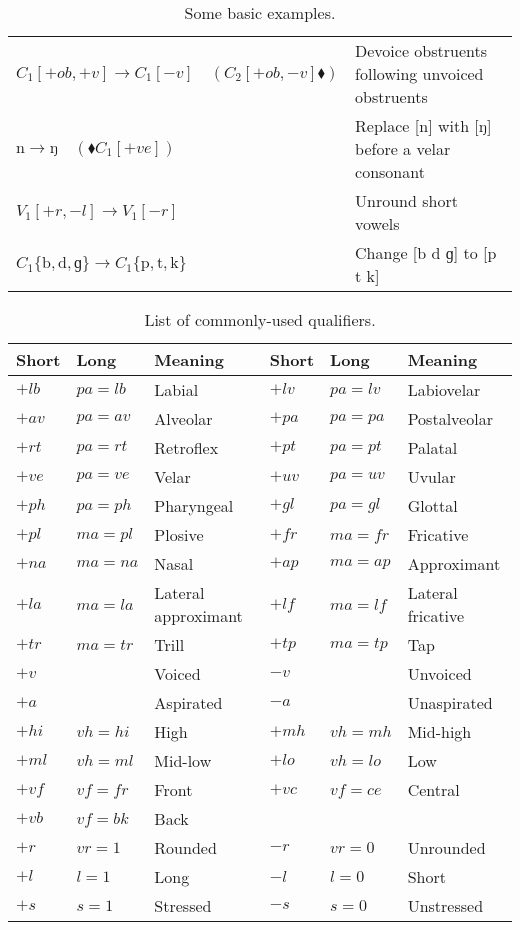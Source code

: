 \documentclass{book}
\begin{document}
\begin{table}[h]
  \caption{Some basic examples.}
  \centering
  \begin{tabu} to \linewidth {|l|X|}
    \hline
    $C_1[+ob,+v] \rightarrow C_1[-v] \quad(C_2[+ob,-v] \blacklozenge)$ & Devoice obstruents following unvoiced obstruents \\
    $\text{n} \rightarrow \text{ŋ} \quad(\blacklozenge C_1[+ve])$ & Replace [n] with [ŋ] before a velar consonant \\
    $V_1[+r,-l] \rightarrow V_1[-r]$ & Unround short vowels \\
    $C_1\{\text{b}, \text{d}, \text{ɡ}\} \rightarrow C_1\{\text{p}, \text{t}, \text{k}\}$ & Change [b d ɡ] to [p t k] \\
    \hline
  \end{tabu}
\end{table}

\begin{table}[h]
  \caption{List of commonly-used qualifiers.}
  \centering
  \begin{tabu} to \linewidth {|l|l|X||l|l|X|}
    \hline
    Short & Long & Meaning & Short & Long & Meaning \\
    \hline
    $+lb$ & $pa=lb$ & Labial & $+lv$ & $pa=lv$ & Labiovelar \\
    $+av$ & $pa=av$ & Alveolar & $+pa$ & $pa=pa$ & Postalveolar \\
    $+rt$ & $pa=rt$ & Retroflex & $+pt$ & $pa=pt$ & Palatal \\
    $+ve$ & $pa=ve$ & Velar & $+uv$ & $pa=uv$ & Uvular \\
    $+ph$ & $pa=ph$ & Pharyngeal & $+gl$ & $pa=gl$ & Glottal \\
    \hline
    $+pl$ & $ma=pl$ & Plosive & $+fr$ & $ma=fr$ & Fricative \\
    $+na$ & $ma=na$ & Nasal & $+ap$ & $ma=ap$ & Approximant \\
    $+la$ & $ma=la$ & Lateral approximant & $+lf$ & $ma=lf$ & Lateral fricative \\
    $+tr$ & $ma=tr$ & Trill & $+tp$ & $ma=tp$ & Tap \\
    \hline
    $+v$ & & Voiced & $-v$ & & Unvoiced \\
    $+a$ & & Aspirated & $-a$ & & Unaspirated \\
    \hline
    $+hi$ & $vh=hi$ & High & $+mh$ & $vh=mh$ & Mid-high \\
    $+ml$ & $vh=ml$ & Mid-low & $+lo$ & $vh=lo$ & Low \\
    \hline
    $+vf$ & $vf=fr$ & Front & $+vc$ & $vf=ce$ & Central \\
    $+vb$ & $vf=bk$ & Back & & & \\
    \hline
    $+r$ & $vr=1$ & Rounded & $-r$ & $vr=0$ & Unrounded \\
    $+l$ & $l=1$ & Long & $-l$ & $l=0$ & Short \\
    $+s$ & $s=1$ & Stressed & $-s$ & $s=0$ & Unstressed \\
    \hline
  \end{tabu}
\end{table}
\end{document}
